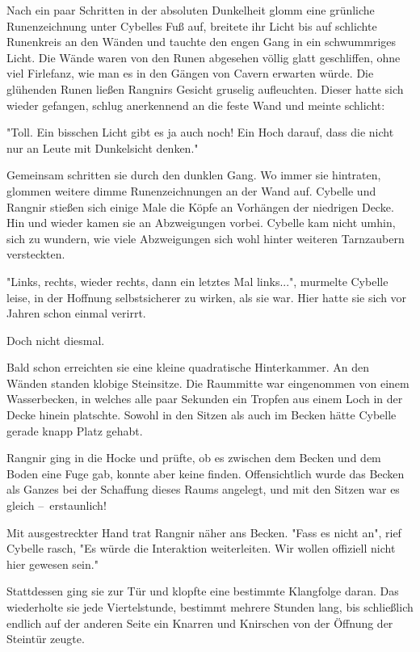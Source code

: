 Nach ein paar Schritten in der absoluten Dunkelheit glomm eine grünliche Runenzeichnung unter Cybelles Fuß auf, breitete ihr Licht bis auf schlichte Runenkreis an den Wänden und tauchte den engen Gang in ein schwummriges Licht. Die Wände waren von den Runen abgesehen völlig glatt geschliffen, ohne viel Firlefanz, wie man es in den Gängen von Cavern erwarten würde. Die glühenden Runen ließen Rangnirs Gesicht gruselig aufleuchten. Dieser hatte sich wieder gefangen, schlug anerkennend an die feste Wand und meinte schlicht: 

"Toll. Ein bisschen Licht gibt es ja auch noch! Ein Hoch darauf, dass die  nicht nur an Leute mit Dunkelsicht denken."

Gemeinsam schritten sie durch den dunklen Gang. Wo immer sie hintraten, glommen weitere dimme Runenzeichnungen an der Wand auf. Cybelle und Rangnir stießen sich einige Male die Köpfe an Vorhängen der niedrigen Decke. Hin und wieder kamen sie an Abzweigungen vorbei. Cybelle kam nicht umhin, sich zu wundern, wie viele Abzweigungen sich wohl hinter weiteren Tarnzaubern versteckten.

"Links, rechts, wieder rechts, dann ein letztes Mal links...", murmelte Cybelle leise, in der Hoffnung selbstsicherer zu wirken, als sie war. Hier hatte sie sich vor Jahren schon einmal verirrt.

Doch nicht diesmal.

Bald schon erreichten sie eine kleine quadratische Hinterkammer. An den Wänden standen klobige Steinsitze. Die Raummitte war eingenommen von einem Wasserbecken, in welches alle paar Sekunden ein Tropfen aus einem Loch in der Decke hinein platschte. Sowohl in den Sitzen als auch im Becken hätte Cybelle gerade knapp Platz gehabt. 

Rangnir ging in die Hocke und prüfte, ob es zwischen dem Becken und dem Boden eine Fuge gab, konnte aber keine finden. Offensichtlich wurde das Becken als Ganzes bei der Schaffung dieses Raums angelegt, und mit den Sitzen war es gleich – erstaunlich!

Mit ausgestreckter Hand trat Rangnir näher ans Becken. "Fass es nicht an", rief Cybelle rasch, "Es würde die Interaktion weiterleiten. Wir wollen offiziell nicht hier gewesen sein." 

Stattdessen ging sie zur Tür und klopfte eine bestimmte Klangfolge daran. Das wiederholte sie jede Viertelstunde, bestimmt mehrere Stunden lang, bis schließlich endlich auf der anderen Seite ein Knarren und Knirschen von der Öffnung der Steintür zeugte.

